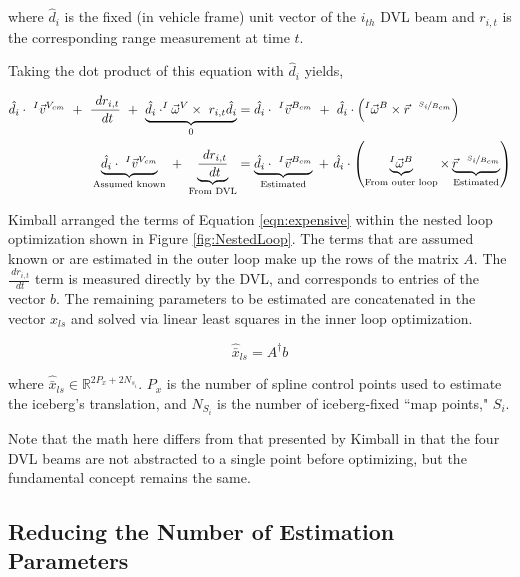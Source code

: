 where $\hat{d}_{i} $ is the fixed (in vehicle frame) unit vector of the $i_{th}$ DVL beam and $r_{i,t} $ is the corresponding range measurement at time $t$.  

Taking the dot product of this equation with $\hat{d}_{i} $ yields,

    \begin{align}
    \hat{d}_{i} \cdot~^{I}\vec{v}^{V_{cm}} ~+~ \frac{~dr_{i,t}}{~dt}  ~+~ \underbrace{\hat{d}_{i} \cdot^{I}\vec{\omega}^{V}\times{~r_{i,t}\hat{d}_{i}}}_{0}  &=
     \label{eqn:expensive}
    \hat{d}_{i} \cdot~^{I}\vec{v}^{B_{cm}} ~ + ~\hat{d}_{i} \cdot\left(^{I}\vec{\omega}^{B}\times\vec{r}^{~~\nicefrac{S_i}{B_{cm}}}\right)  \\
    \underbrace{\hat{d}_{i} \cdot~^{I}\vec{v}^{V_{cm}}}_{\text{Assumed known}} ~+~ \underbrace{\frac{~dr_{i,t}}{~dt} }_{\text{From DVL}}  &=
    \underbrace{\hat{d}_{i} \cdot~^{I}\vec{v}^{B_{cm}}}_{\text{Estimated}} ~ + ~\hat{d}_{i} \cdot\left(\underbrace{^{I}\vec{\omega}^{B}}_{\text{From outer loop}}\times\underbrace{\vec{r}^{~~\nicefrac{S_i}{B_{cm}}}}_{\text{Estimated}}\right)  
         \label{eqn:expensive}
\end{align}

Kimball arranged the terms of Equation \ref{eqn:expensive} within the nested loop optimization shown in Figure \ref{fig:NestedLoop}. The terms that are assumed known or are estimated in the outer loop make up the rows of the matrix $A$. The $\frac{~dr_{i,t}}{~dt}$ term is measured directly by the DVL, and corresponds to entries of the vector $b$. The remaining parameters to be estimated are concatenated in the vector $x_{ls}$ and solved via linear least squares in the inner loop optimization. 

\begin{equation}
    \hat{\bar{x}}_{ls} = A^{\dagger} b
    \label{eqn:LeastSquares}
\end{equation}

where $\hat{\bar{x}}_{ls}  \in \mathbb{R}^{ 2P_x + 2N_{s_i}}$. $P_x$ is the number of spline control points used to estimate the iceberg's translation, and $N_{S_i}$ is the number of iceberg-fixed ``map points," $S_i$.


Note that the math here differs from that presented by Kimball in that the four DVL beams are not abstracted to a single point before optimizing, but the fundamental concept remains the same.



\subsection{Reducing the Number of Estimation Parameters}

